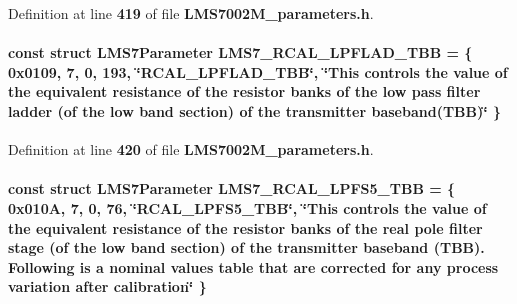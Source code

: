 Definition at line {\bf 419} of file {\bf L\+M\+S7002\+M\+\_\+parameters.\+h}.

\paragraph[{L\+M\+S7\+\_\+\+R\+C\+A\+L\+\_\+\+L\+P\+F\+L\+A\+D\+\_\+\+T\+BB}]{\setlength{\rightskip}{0pt plus 5cm}const struct {\bf L\+M\+S7\+Parameter} L\+M\+S7\+\_\+\+R\+C\+A\+L\+\_\+\+L\+P\+F\+L\+A\+D\+\_\+\+T\+BB = \{ 0x0109, 7, 0, 193, \char`\"{}\+R\+C\+A\+L\+\_\+\+L\+P\+F\+L\+A\+D\+\_\+\+T\+B\+B\char`\"{}, \char`\"{}\+This controls the value of the equivalent resistance of the resistor banks of the low pass filter ladder (of the low band section) of the transmitter baseband(\+T\+B\+B)\char`\"{} \}\hspace{0.3cm}{\ttfamily [static]}}\label{LMS7002M__parameters_8h_a252a412ca4e8f888b51c867e18478dca}


Definition at line {\bf 420} of file {\bf L\+M\+S7002\+M\+\_\+parameters.\+h}.

\paragraph[{L\+M\+S7\+\_\+\+R\+C\+A\+L\+\_\+\+L\+P\+F\+S5\+\_\+\+T\+BB}]{\setlength{\rightskip}{0pt plus 5cm}const struct {\bf L\+M\+S7\+Parameter} L\+M\+S7\+\_\+\+R\+C\+A\+L\+\_\+\+L\+P\+F\+S5\+\_\+\+T\+BB = \{ 0x010\+A, 7, 0, 76, \char`\"{}\+R\+C\+A\+L\+\_\+\+L\+P\+F\+S5\+\_\+\+T\+B\+B\char`\"{}, \char`\"{}\+This controls the value of the equivalent resistance of the resistor banks of the real pole filter stage (of the low band section) of the transmitter baseband (\+T\+B\+B). Following is a nominal values table that are corrected for any process variation after calibration\char`\"{} \}\hspace{0.3cm}{\ttfamily [static]}}\label{LMS7002M__parameters_8h_af58191329ac03d37dd51ab01387a70d8}


